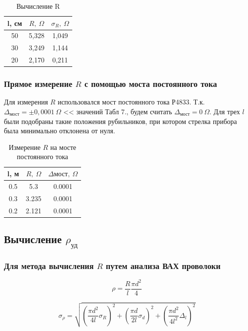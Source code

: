 \documentclass{article}
\begin{document}
	
	\begin{table}[H]
		\centering
		\begin{tabular}{|c|c|c|}
			\hline
			l, см & $R, ~\Omega$ & $\sigma_{R}, ~\Omega$ \\ \hline
			50 & 5,328 & 1,049 \\ \hline
			30 & 3,249 & 1,144  \\ \hline
			20 & 2,170 & 0,211 \\ \hline
		\end{tabular}
		\label{RRR}
		\caption{Вычисление R}
	\end{table}
	
	
	
	\subsubsection{Прямое измерение $R$ с помощью моста постоянного тока}
	Для измерения $R$ использовался мост постоянного тока Р4833. Т.к. $\Delta_{\text{мост}} = \pm 0,0001 ~\Omega $ << значений Табл 7., будем считать $\Delta_{\text{мост}} = 0 ~\Omega$. Для трех $l$ были подобраны такие положения рубильников, при котором стрелка прибора была минимально отклонена от нуля.\\
	\begin{table}[H]
		\centering
		\begin{tabular}{|c|c|c|}
			\hline
			l, м & $R, ~\Omega$ & $\Delta{\text{мост}}, ~\Omega$ \\ \hline
			0.5 & 5.3 & 0.0001 \\ \hline
			0.3 & 3.235 & 0.0001 \\ \hline
			0.2 & 2.121 & 0.0001 \\ \hline
		\end{tabular}
		\caption{Измерение $R$ на мосте постоянного тока}
	\end{table}
	
	
	
	\subsection{Вычисление $\rho_{\text{уд}}$}
	\subsubsection{Для метода вычисления $R$ путем анализа ВАХ проволоки}
	$$ \rho = \frac{R}{l}{\frac{{\pi}d^2}{4}} $$
	
	$$\sigma_{\rho} = \sqrt{(\frac{\pi d^{2}}{4l} \sigma_{R})^{2} +
		(\frac{\pi d}{2l} \sigma_{d})^{2} +
		(\frac{\pi d^{2}}{4l^{2}} \Delta_{l})^{2}}$$
	
\end{document}

